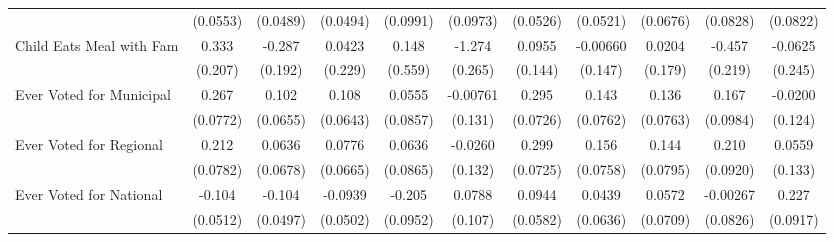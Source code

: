 {\begin{tabular}{l*{10}{c}}
            &    (0.0553)         &    (0.0489)         &    (0.0494)         &    (0.0991)         &    (0.0973)         &    (0.0526)         &    (0.0521)         &    (0.0676)         &    (0.0828)         &    (0.0822)         \\
\addlinespace
Child Eats Meal with Fam&       0.333         &      -0.287         &      0.0423         &       0.148         &      -1.274\sym{***}&      0.0955         &    -0.00660         &      0.0204         &      -0.457\sym{*}  &     -0.0625         \\
            &     (0.207)         &     (0.192)         &     (0.229)         &     (0.559)         &     (0.265)         &     (0.144)         &     (0.147)         &     (0.179)         &     (0.219)         &     (0.245)         \\
\addlinespace
Ever Voted for Municipal&       0.267\sym{***}&       0.102         &       0.108         &      0.0555         &    -0.00761         &       0.295\sym{***}&       0.143         &       0.136         &       0.167         &     -0.0200         \\
            &    (0.0772)         &    (0.0655)         &    (0.0643)         &    (0.0857)         &     (0.131)         &    (0.0726)         &    (0.0762)         &    (0.0763)         &    (0.0984)         &     (0.124)         \\
\addlinespace
Ever Voted for Regional&       0.212\sym{**} &      0.0636         &      0.0776         &      0.0636         &     -0.0260         &       0.299\sym{***}&       0.156\sym{*}  &       0.144         &       0.210\sym{*}  &      0.0559         \\
            &    (0.0782)         &    (0.0678)         &    (0.0665)         &    (0.0865)         &     (0.132)         &    (0.0725)         &    (0.0758)         &    (0.0795)         &    (0.0920)         &     (0.133)         \\
\addlinespace
Ever Voted for National&      -0.104\sym{*}  &      -0.104\sym{*}  &     -0.0939         &      -0.205\sym{*}  &      0.0788         &      0.0944         &      0.0439         &      0.0572         &    -0.00267         &       0.227\sym{*}  \\
            &    (0.0512)         &    (0.0497)         &    (0.0502)         &    (0.0952)         &     (0.107)         &    (0.0582)         &    (0.0636)         &    (0.0709)         &    (0.0826)         &    (0.0917)         \\
\bottomrule
\end{tabular}
}
